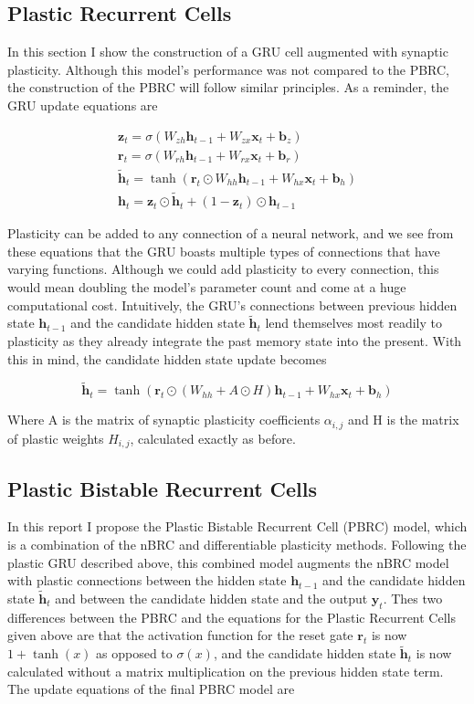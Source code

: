 \subsection*{Plastic Recurrent Cells}

In this section I show the construction of a GRU cell augmented with synaptic plasticity. Although this model's performance was not compared to the PBRC, the construction of the PBRC will follow similar principles.
As a reminder, the GRU update equations are

\begin{gather*}
	\mathbf{z}_t = \sigma(W_{zh} \mathbf{h}_{t-1} + W_{zx} \mathbf{x}_t + \mathbf{b}_z)\\
	\mathbf{r}_t = \sigma(W_{rh} \mathbf{h}_{t-1} + W_{rx} \mathbf{x}_t + \mathbf{b}_r)\\
	\mathbf{\tilde{h}}_t = \tanh(\mathbf{r}_t \odot W_{hh} \mathbf{h}_{t-1} + W_{hx} \mathbf{x}_t + \mathbf{b}_h)\\
	\mathbf{h}_t = \mathbf{z}_t \odot \mathbf{\tilde{h}}_t + (1 - \mathbf{z}_t) \odot \mathbf{h}_{t-1}
\end{gather*}

Plasticity can be added to any connection of a neural network, and we see from these equations that the GRU boasts multiple types of connections that have varying functions. Although we could add plasticity to every connection, this would mean doubling the model's parameter count and come at a huge computational cost. Intuitively, the GRU's connections between previous hidden state \(\mathbf{h}_{t-1}\) and the candidate hidden state \(\mathbf{\tilde{h}}_t\) lend themselves most readily to plasticity as they already integrate the past memory state into the present. With this in mind, the candidate hidden state update becomes

\[ \mathbf{\tilde{h}}_t = \tanh(\mathbf{r}_t \odot (W_{hh} + A \odot H) \mathbf{h}_{t-1} + W_{hx} \mathbf{x}_t + \mathbf{b}_h) \]

Where A is the matrix of synaptic plasticity coefficients \(\alpha_{i,j}\) and H is the matrix of plastic weights \(H_{i,j}\), calculated exactly as before.

\subsection*{Plastic Bistable Recurrent Cells}

In this report I propose the Plastic Bistable Recurrent Cell (PBRC) model, which is a combination of the nBRC and differentiable plasticity methods. Following the plastic GRU described above, this combined model augments the nBRC model with plastic connections between the hidden state \(\mathbf{h}_{t-1}\) and the candidate hidden state \(\mathbf{\tilde{h}}_t\) and between the candidate hidden state and the output \(\mathbf{y}_t\). Thes two differences between the PBRC and the equations for the Plastic Recurrent Cells given above are that the activation function for the reset gate \(\mathbf{r}_t\) is now \(1 + \tanh(x)\) as opposed to \(\sigma(x)\), and the candidate hidden state \(\mathbf{\tilde{h}}_t\) is now calculated without a matrix multiplication on the previous hidden state term.
The update equations of the final PBRC model are

